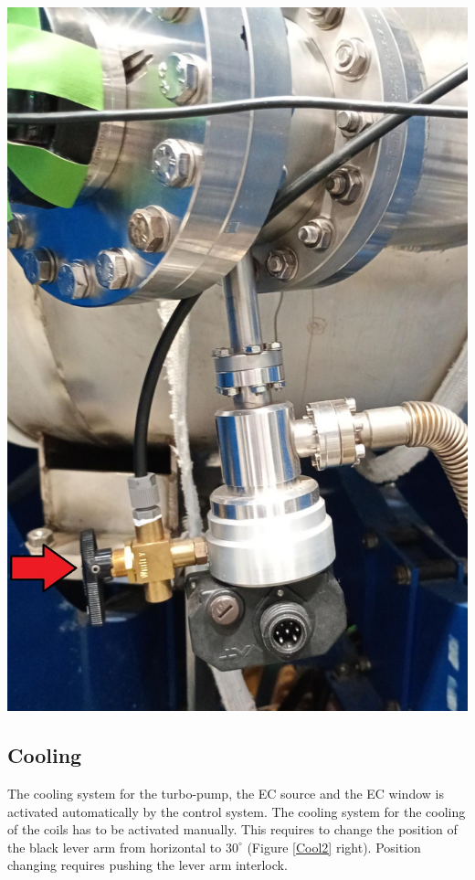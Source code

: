 \documentclass[fleqn,a4paper,20pt]{article}
\begin{document}
\begin{minipage}{.3\textwidth}
	\centering
	\includegraphics[width=\linewidth]{Gas3}
	\label{Gas3}
\end{minipage}	
			

\subsection{Cooling}

The cooling system for the turbo-pump, the EC source and the EC window is activated automatically by the control system. The cooling system for the cooling of the coils has to be activated manually. This requires to change the position of the black lever arm from horizontal to $30^\circ$ (Figure \ref{Cool2} right). Position changing requires pushing the lever arm interlock.\\
\end{document}
